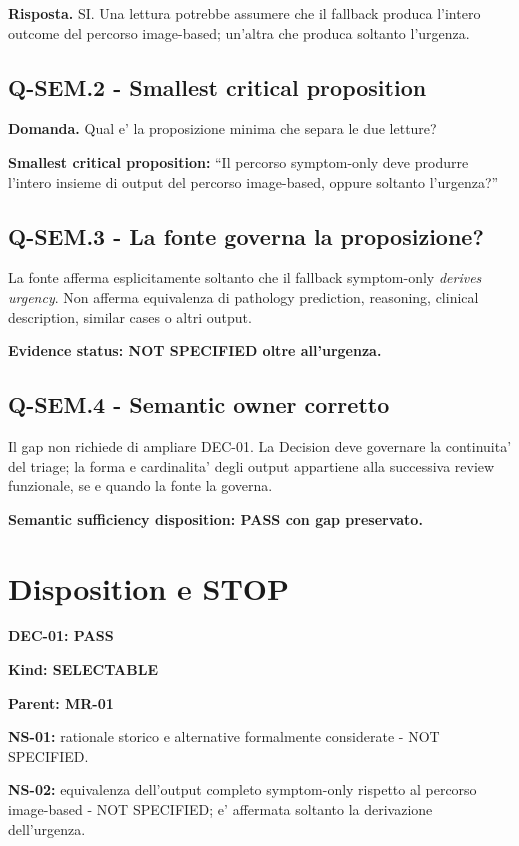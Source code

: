 \documentclass[11pt,a4paper]{article}
\begin{document}
\textbf{Risposta.} SI. Una lettura potrebbe assumere che il fallback produca l'intero outcome del percorso image-based; un'altra che produca soltanto l'urgenza.

\subsection{Q-SEM.2 - Smallest critical proposition}
\begin{ddtacheck}
\textbf{Domanda.} Qual e' la proposizione minima che separa le due letture?
\end{ddtacheck}

\textbf{Smallest critical proposition:} ``Il percorso symptom-only deve produrre l'intero insieme di output del percorso image-based, oppure soltanto l'urgenza?''

\subsection{Q-SEM.3 - La fonte governa la proposizione?}
La fonte afferma esplicitamente soltanto che il fallback symptom-only \emph{derives urgency}. Non afferma equivalenza di pathology prediction, reasoning, clinical description, similar cases o altri output.

\textbf{Evidence status: NOT SPECIFIED oltre all'urgenza.}

\subsection{Q-SEM.4 - Semantic owner corretto}
Il gap non richiede di ampliare DEC-01. La Decision deve governare la continuita' del triage; la forma e cardinalita' degli output appartiene alla successiva review funzionale, se e quando la fonte la governa.

\textbf{Semantic sufficiency disposition: PASS con gap preservato.}

\section{Disposition e STOP}

\begin{ddtacore}[title={DEC-01 disposition}]
\textbf{DEC-01: PASS}\par
\textbf{Kind: SELECTABLE}\par
\textbf{Parent: MR-01}\par
\textbf{NS-01:} rationale storico e alternative formalmente considerate - NOT SPECIFIED.\par
\textbf{NS-02:} equivalenza dell'output completo symptom-only rispetto al percorso image-based - NOT SPECIFIED; e' affermata soltanto la derivazione dell'urgenza.
\end{ddtacore}
\end{document}
